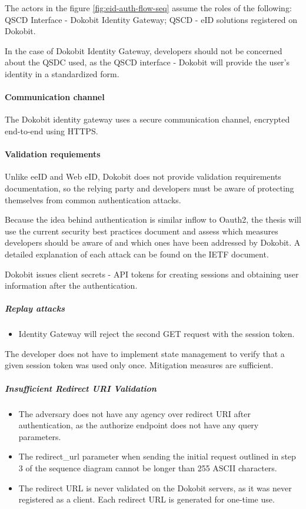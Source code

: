 The actors in the figure \ref{fig:eid-auth-flow-seq} assume the roles of the following: QSCD Interface - Dokobit Identity Gateway; QSCD - eID solutions registered on Dokobit.

In the case of Dokobit Identity Gateway, developers should not be concerned about the QSDC used, as the QSCD interface - Dokobit will provide the user's identity in a standardized form.

\paragraph{Communication channel}

The Dokobit identity gateway uses a secure communication channel, encrypted end-to-end using HTTPS.

\paragraph{Validation requiements}

Unlike eeID and Web eID, Dokobit does not provide validation requirements documentation, so the relying party and developers must be aware of protecting themselves from common authentication attacks.

Because the idea behind authentication is similar inflow to Oauth2, the thesis will use the current security best practices document \cite{ietf-oauth-security-topics-19} and assess which measures developers should be aware of and which ones have been addressed by Dokobit. A detailed explanation of each attack can be found on the IETF document.

Dokobit issues client secrets - API tokens for creating sessions and obtaining user information after the authentication.

\subparagraph{Replay attacks}

\begin{itemize}
  \item Identity Gateway will reject the second GET request with the session token.
\end{itemize}

The developer does not have to implement state management to verify that a given session token was used only once. Mitigation measures are sufficient.

\subparagraph{Insufficient Redirect URI Validation}

\begin{itemize}
  \item The adversary does not have any agency over redirect URI after authentication, as the {authorize} endpoint does not have any query parameters.
  \item The redirect\_url parameter when sending the initial request outlined in step 3 of the sequence diagram cannot be longer than 255 ASCII characters.
  \item The redirect URL is never validated on the Dokobit servers, as it was never registered as a client. Each redirect URL is generated for one-time use.
\end{itemize}


